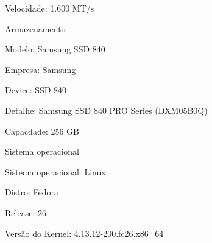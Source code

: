 \begin{alineas}
\begin{alineas}
     \item Velocidade: 1.600 MT/s

  \end{alineas}

  \item Armazenamento

  \begin{alineas}

     \item Modelo: Samsung SSD 840

     \item Empresa: Samsung

     \item Device: SSD 840

     \item Detalhe: Samsung SSD 840 PRO Series (DXM05B0Q)

     \item Capacdade: 256 GB

  \end{alineas}

  \item Sistema operacional

  \begin{alineas}

     \item Sistema operacional: Linux

     \item Distro: Fedora

     \item Release: 26

     \item Versão do Kernel: 4.13.12-200.fc26.x86\_64

  \end{alineas}

\end{alineas}
